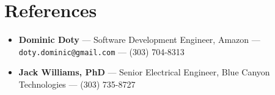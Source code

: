 \documentclass[11pt]{article}
\begin{document}
\section*{References}
\begin{itemize}[leftmargin=*]
\item \textbf{Dominic Doty} --- Software Development Engineer, Amazon --- \texttt{doty.dominic@gmail.com} --- (303) 704-8313
\item \textbf{Jack Williams, PhD} --- Senior Electrical Engineer, Blue Canyon Technologies --- (303) 735-8727
\end{itemize}
\end{document}
